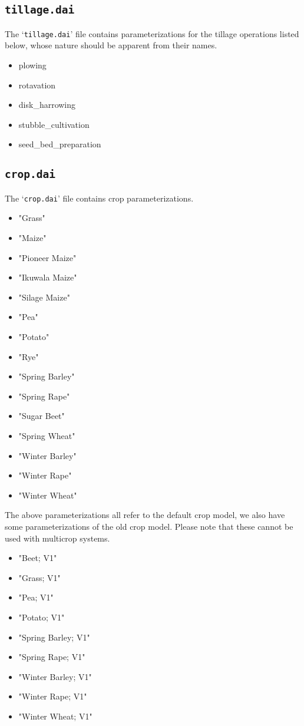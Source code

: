 \subsection{\texttt{tillage.dai}}

The `\texttt{tillage.dai}' file contains parameterizations for the
tillage operations listed below, whose nature should be apparent from
their names.
\begin{itemize}
\item plowing
\item rotavation
\item disk\_harrowing
\item stubble\_cultivation
\item seed\_bed\_preparation
\end{itemize}

\subsection{\texttt{crop.dai}}

The `\texttt{crop.dai}' file contains crop parameterizations.

\begin{itemize}
\item "Grass"
\item "Maize"
\item "Pioneer Maize"
\item "Ikuwala Maize"
\item "Silage Maize"
\item "Pea"
\item "Potato"
\item "Rye"
\item "Spring Barley"
\item "Spring Rape"
\item "Sugar Beet"
\item "Spring Wheat"
\item "Winter Barley"
\item "Winter Rape"
\item "Winter Wheat"
\end{itemize}

The above parameterizations all refer to the default crop model, we
also have some parameterizations of the old crop model.  Please note
that these cannot be used with multicrop systems.

\begin{itemize}
\item "Beet; V1"
\item "Grass; V1"
\item "Pea; V1"
\item "Potato; V1"
\item "Spring Barley; V1"
\item "Spring Rape; V1"
\item "Winter Barley; V1"
\item "Winter Rape; V1"
\item "Winter Wheat; V1"
\end{itemize}


